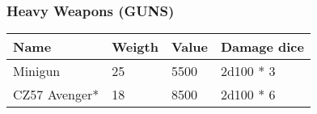
\subsubsection{Heavy Weapons (GUNS)}
\begin{longtable}{|p{4cm}|p{1.5cm}|p{1.5cm}|p{9cm}|}
\hline
\bfseries Name & \bfseries Weigth & \bfseries Value & \bfseries Damage dice \\
\hline
Minigun & 25 & 5500 & 2d100 * 3 \\
CZ57 Avenger* & 18 & 8500 & 2d100 * 6 \\
\hline
\end{longtable}
